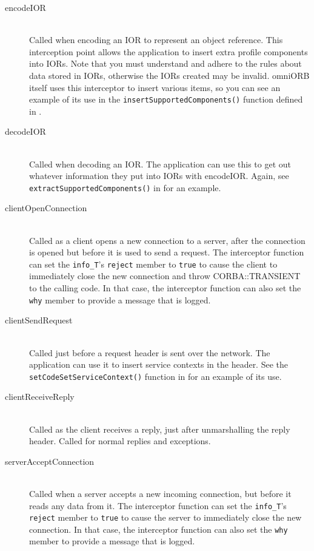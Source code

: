 \documentclass[11pt,oneside,a4paper]{book}
\newcommand{\code}[1]{\texttt{#1}}
\newcommand{\op}[1]{\texttt{#1()}}
\newcommand{\dsc}{\discretionary{}{}{}}
\begin{document}
\begin{description}

\item[encodeIOR]\mbox{}\\
%
Called when encoding an IOR to represent an object reference. This
interception point allows the application to insert extra profile
components into IORs. Note that you must understand and adhere to the
rules about data stored in IORs, otherwise the IORs created may be
invalid. omniORB itself uses this interceptor to insert various items,
so you can see an example of its use in the
\op{insertSupportedComponents} function defined in
.


\item[decodeIOR]\mbox{}\\
%
Called when decoding an IOR. The application can use this to get out
whatever information they put into IORs with encodeIOR. Again, see
\op{extract\dsc{}SupportedComponents} in
 for an example.


\item[clientOpenConnection]\mbox{}\\
%
Called as a client opens a new connection to a server, after the
connection is opened but before it is used to send a request. The
interceptor function can set the \code{info\_T}'s \code{reject} member
to \code{true} to cause the client to immediately close the new
connection and throw CORBA::TRANSIENT to the calling code. In that
case, the interceptor function can also set the \code{why} member to
provide a message that is logged.


\item[clientSendRequest]\mbox{}\\
%
Called just before a request header is sent over the network. The
application can use it to insert service contexts in the header. See
the \op{setCodeSet\dsc{}ServiceContext} function in
 for an example of its use.


\item[clientReceiveReply]\mbox{}\\
%
Called as the client receives a reply, just after unmarshalling the
reply header. Called for normal replies and exceptions.


\item[serverAcceptConnection]\mbox{}\\
%
Called when a server accepts a new incoming connection, but before it
reads any data from it. The interceptor function can set the
\code{info\_T}'s \code{reject} member to \code{true} to cause the
server to immediately close the new connection. In that case, the
interceptor function can also set the \code{why} member to provide a
message that is logged.



\end{description}
\end{document}
